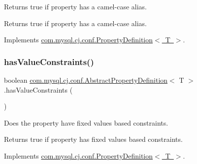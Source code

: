 Returns true if property has a camel-\/case alias.

\begin{DoxyReturn}{Returns}
true if property has a camel-\/case alias. 
\end{DoxyReturn}


Implements \mbox{\hyperlink{interfacecom_1_1mysql_1_1cj_1_1conf_1_1_property_definition_a665ced842d6e306f68c31df34587afca}{com.\+mysql.\+cj.\+conf.\+Property\+Definition$<$ T $>$}}.

\mbox{\label{classcom_1_1mysql_1_1cj_1_1conf_1_1_abstract_property_definition_a2a34114907269a32b04a433c42982355}} 
\subsubsection{\texorpdfstring{has\+Value\+Constraints()}{hasValueConstraints()}}
{\footnotesize\ttfamily boolean \mbox{\hyperlink{classcom_1_1mysql_1_1cj_1_1conf_1_1_abstract_property_definition}{com.\+mysql.\+cj.\+conf.\+Abstract\+Property\+Definition}}$<$ T $>$.has\+Value\+Constraints (\begin{DoxyParamCaption}{ }\end{DoxyParamCaption})}

Does the property have fixed values based constraints.

\begin{DoxyReturn}{Returns}
true if property has fixed values based constraints. 
\end{DoxyReturn}


Implements \mbox{\hyperlink{interfacecom_1_1mysql_1_1cj_1_1conf_1_1_property_definition_a8f2457ea9870439d45581873ff8f3855}{com.\+mysql.\+cj.\+conf.\+Property\+Definition$<$ T $>$}}.

\mbox{\label{classcom_1_1mysql_1_1cj_1_1conf_1_1_abstract_property_definition_a9395e63d016a2cf36bd19860dc160a29}} 
